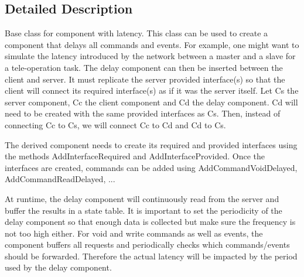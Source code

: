 \subsection{Detailed Description}
Base class for component with latency. This class can be used to create a component that delays all commands and events. For example, one might want to simulate the latency introduced by the network between a master and a slave for a tele-\/operation task. The delay component can then be inserted between the client and server. It must replicate the server provided interface(s) so that the client will connect its required interface(s) as if it was the server itself. Let Cs the server component, Cc the client component and Cd the delay component. Cd will need to be created with the same provided interfaces as Cs. Then, instead of connecting Cc to Cs, we will connect Cc to Cd and Cd to Cs.

The derived component needs to create its required and provided interfaces using the methods Add\-Interface\-Required and Add\-Interface\-Provided. Once the interfaces are created, commands can be added using Add\-Command\-Void\-Delayed, Add\-Command\-Read\-Delayed, ...

At runtime, the delay component will continuously read from the server and buffer the results in a state table. It is important to set the periodicity of the delay component so that enough data is collected but make sure the frequency is not too high either. For void and write commands as well as events, the component buffers all requests and periodically checks which commands/events should be forwarded. Therefore the actual latency will be impacted by the period used by the delay component. 


